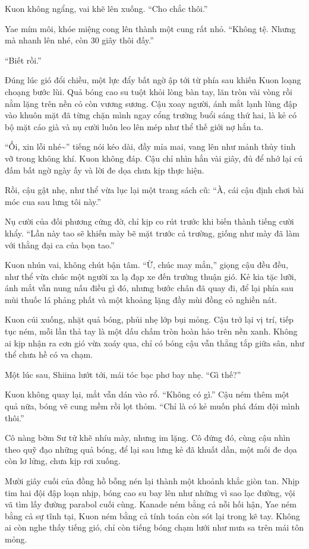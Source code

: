\documentclass[../main.tex]{subfiles}
\begin{document}
Kuon không ngẩng, vai khẽ lên xuống. ``Cho chắc thôi.''

Yae mím môi, khóe miệng cong lên thành một cung rất nhỏ. ``Không tệ. Nhưng mà nhanh lên nhé, còn 30 giây thôi đấy.''

``Biết rồi.''

Đúng lúc gió đổi chiều, một lực đẩy bất ngờ ập tới từ phía sau khiến Kuon loạng choạng bước lùi. Quả bóng cao su tuột khỏi lòng bàn tay, lăn tròn vài vòng rồi nằm lặng trên nền cỏ còn vương sương. Cậu xoay người, ánh mắt lạnh lùng đập vào khuôn mặt đã từng chặn mình ngay cổng trường buổi sáng thứ hai, là kẻ có bộ mặt cáo già và nụ cười luôn leo lên mép như thể thế giới nợ hắn ta.

``Ối, xin lỗi nhé\~{}'' tiếng nói kéo dài, đầy mỉa mai, vang lên như mảnh thủy tinh vỡ trong không khí. Kuon không đáp. Cậu chỉ nhìn hắn vài giây, đủ để nhớ lại cú đấm bất ngờ ngày ấy và lời đe dọa chưa kịp thực hiện.

Rồi, cậu gật nhẹ, như thể vừa lục lại một trang sách cũ: ``À, cái cậu định chơi bài móc cua sau lưng tôi này.''

Nụ cười của đối phương cứng đờ, chỉ kịp co rút trước khi biến thành tiếng cười khẩy. ``Lần này tao sẽ khiến mày bẽ mặt trước cả trường, giống như mày đã làm với thằng đại ca của bọn tao.''

Kuon nhún vai, không chút bận tâm. ``Ừ, chúc may mắn,'' giọng cậu đều đều, như thể vừa chúc một người xa lạ đạp xe đến trường thuận gió. Kẻ kia tặc lưỡi, ánh mắt vẫn nung nấu điều gì đó, nhưng bước chân đã quay đi, để lại phía sau mùi thuốc lá phảng phất và một khoảng lặng đầy mùi đồng cỏ nghiền nát.

Kuon cúi xuống, nhặt quả bóng, phủi nhẹ lớp bụi mỏng. Cậu trở lại vị trí, tiếp tục ném, mỗi lần thả tay là một dấu chấm tròn hoàn hảo trên nền xanh. Không ai kịp nhận ra cơn gió vừa xoáy qua, chỉ có bóng cậu vẫn thẳng tắp giữa sân, như thể chưa hề có va chạm.

Một lúc sau, Shiina lướt tới, mái tóc bạc phơ bay nhẹ. ``Gì thế?''

Kuon không quay lại, mắt vẫn dán vào rổ. ``Không có gì.'' Cậu ném thêm một quả nữa, bóng vẽ cung mềm rồi lọt thỏm. ``Chỉ là có kẻ muốn phá đám đội mình thôi.''

Cô nàng bờm Sư tử khẽ nhíu mày, nhưng im lặng. Cô đứng đó, cùng cậu nhìn theo quỹ đạo những quả bóng, để lại sau lưng kẻ đã khuất dần, một mối đe dọa còn lơ lửng, chưa kịp rơi xuống.

Mười giây cuối của đồng hồ bỗng nén lại thành một khoảnh khắc giòn tan. Nhịp tim hai đội đập loạn nhịp, bóng cao su bay lên như những vì sao lạc đường, vội vã tìm lấy đường parabol cuối cùng. Kanade ném bằng cả nỗi hối hận, Yae ném bằng cả sự tĩnh tại, Kuon ném bằng cả tính toán còn sót lại trong kẽ tay. Không ai còn nghe thấy tiếng gió, chỉ còn tiếng bóng chạm lưới như mưa sa trên mái tôn mỏng.
\end{document}
